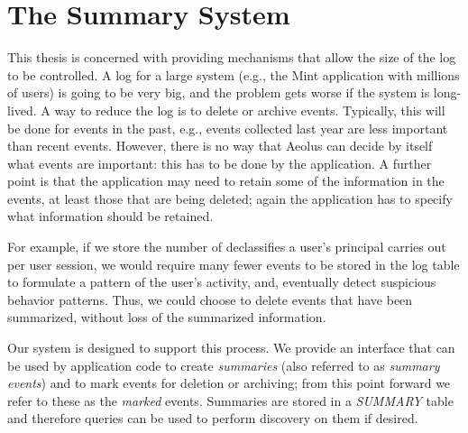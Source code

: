\chapter{The Summary System}

This thesis is concerned with providing mechanisms that allow the size of the log to be controlled. A log for a large system (e.g., the Mint application with millions of users) is going to be very big, and the problem gets worse if the system is long-lived. A way to reduce the log is to delete or archive events. Typically, this will be done for events in the past, e.g., events collected last year are less important than recent events. However, there is no way that Aeolus can decide by itself what events are important: this has to be done by the application. A further point is that the application may need to retain some of the information in the events, at least those that are being deleted; again the application has to specify what information should be retained.

For example, if we store the number of declassifies a user's principal carries out per user session, we would require many fewer events to be stored in the log table to formulate a pattern of the user's activity, and, eventually detect suspicious behavior patterns. Thus, we could choose to delete events that have been summarized, without loss of the summarized information.

Our system is designed to support this process. We provide an interface that can be used by application code to create \emph{summaries} (also referred to as \emph{summary events}) and to mark events for deletion or archiving; from this point forward we refer to these as the \emph{marked} events. Summaries are stored in a \emph{SUMMARY} table and therefore queries can be used to perform discovery on them if desired.



